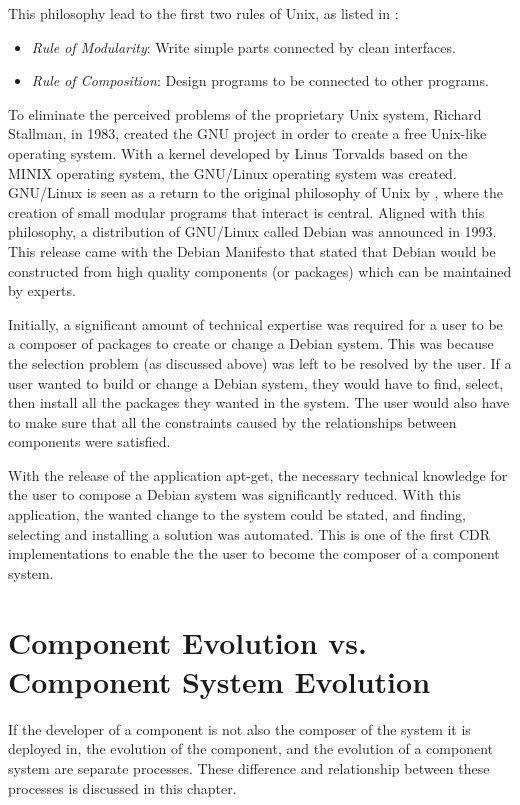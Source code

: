 This philosophy lead to the first two rules of Unix, as listed in \citep{raymond2003art}:
\begin{itemize}
  \item \textit{Rule of Modularity}: Write simple parts connected by clean interfaces.
  \item \textit{Rule of Composition}: Design programs to be connected to other programs.
\end{itemize} 

To eliminate the perceived problems of the proprietary Unix system, Richard Stallman, in 1983, created the GNU project \citep{stallman1985gnu} in order to create a free Unix-like operating system.
With a kernel developed by Linus Torvalds based on the MINIX \citep{tanenbaum1989minix} operating system, the GNU/Linux \citep{torvalds2002just} operating system was created.
GNU/Linux is seen as a return to the original philosophy of Unix by \cite{Gancarz2003}, where the creation of small modular programs that interact is central.
Aligned with this philosophy, a distribution of GNU/Linux called Debian \citep{Barth2005} was announced in 1993.
This release came with the Debian Manifesto \citep{murdock1994brief} 
that stated that Debian would be constructed from high quality components (or packages) which can be maintained by experts.

Initially, a significant amount of technical expertise was required for a user to be a composer of packages to create or change a Debian system.
This was because the selection problem (as discussed above) was left to be resolved by the user.
If a user wanted to build or change a Debian system, they would have to find, select, then install all the packages they wanted in the system.
The user would also have to make sure that all the constraints caused by the relationships between components were satisfied.

With the release of the application apt-get, the necessary technical knowledge for the user to compose a Debian system was significantly reduced.
With this application, the wanted change to the system could be stated, and finding, selecting and installing a solution was automated.
This is one of the first CDR implementations to enable the the user to become the composer of a component system.

\section{Component Evolution vs. Component System Evolution}
\label{background.componentsystemevolution}
If the developer of a component is not also the composer of the system it is deployed in, the evolution of the component, and the evolution of a component system are separate processes.
These difference and relationship between these processes is discussed in this chapter.

